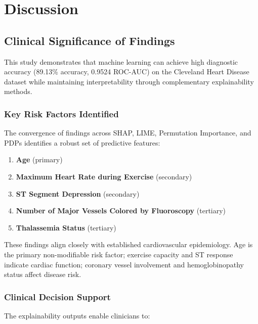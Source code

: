 \documentclass[journal]{IEEEtran}
\begin{document}
\section{Discussion}\label{sec:discussion}

\subsection{Clinical Significance of Findings}

This study demonstrates that machine learning can achieve high diagnostic accuracy (89.13\% accuracy, 0.9524 ROC-AUC) on the Cleveland Heart Disease dataset while maintaining interpretability through complementary explainability methods.

\subsubsection{Key Risk Factors Identified}

The convergence of findings across SHAP, LIME, Permutation Importance, and PDPs identifies a robust set of predictive features:

\begin{enumerate}
    \item \textbf{Age} (primary)
    \item \textbf{Maximum Heart Rate during Exercise} (secondary)
    \item \textbf{ST Segment Depression} (secondary)
    \item \textbf{Number of Major Vessels Colored by Fluoroscopy} (tertiary)
    \item \textbf{Thalassemia Status} (tertiary)
\end{enumerate}

These findings align closely with established cardiovascular epidemiology. Age is the primary non-modifiable risk factor; exercise capacity and ST response indicate cardiac function; coronary vessel involvement and hemoglobinopathy status affect disease risk.

\subsubsection{Clinical Decision Support}

The explainability outputs enable clinicians to:
\end{document}
